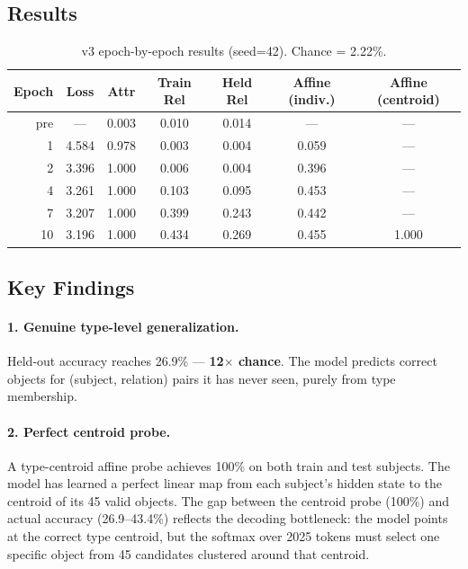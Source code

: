 \documentclass[11pt]{article}
\begin{document}
\subsection{Results}

\begin{table}[h]
\centering
\caption{v3 epoch-by-epoch results (seed=42). Chance = 2.22\%.}
\label{tab:v3}
\begin{tabular}{rcccccc}
\toprule
Epoch & Loss & Attr & Train Rel & Held Rel & Affine (indiv.) & Affine (centroid) \\
\midrule
pre & --- & 0.003 & 0.010 & 0.014 & --- & --- \\
1 & 4.584 & 0.978 & 0.003 & 0.004 & 0.059 & --- \\
2 & 3.396 & 1.000 & 0.006 & 0.004 & 0.396 & --- \\
4 & 3.261 & 1.000 & 0.103 & 0.095 & 0.453 & --- \\
7 & 3.207 & 1.000 & 0.399 & 0.243 & 0.442 & --- \\
10 & 3.196 & 1.000 & 0.434 & 0.269 & 0.455 & 1.000 \\
\bottomrule
\end{tabular}
\end{table}

\subsection{Key Findings}

\paragraph{1. Genuine type-level generalization.}
Held-out accuracy reaches 26.9\% --- \textbf{12$\times$ chance}.  The model predicts
correct objects for (subject, relation) pairs it has never seen, purely from type
membership.

\paragraph{2. Perfect centroid probe.}
A type-centroid affine probe achieves 100\% on both train and test subjects.  The
model has learned a perfect linear map from each subject's hidden state to the centroid
of its 45 valid objects.  The gap between the centroid probe (100\%) and actual accuracy
(26.9--43.4\%) reflects the decoding bottleneck: the model points at the correct type
centroid, but the softmax over 2025 tokens must select one specific object from 45
candidates clustered around that centroid.
\end{document}
